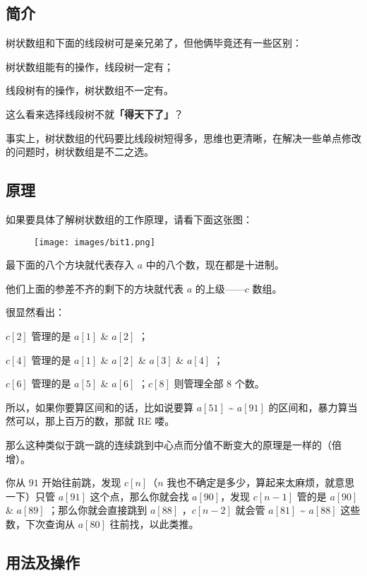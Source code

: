 
\subsection{简介}

\hr

树状数组和下面的线段树可是亲兄弟了，但他俩毕竟还有一些区别：

树状数组能有的操作，线段树一定有；

线段树有的操作，树状数组不一定有。

这么看来选择线段树不就\textbf{「得天下了」}？

事实上，树状数组的代码要比线段树短得多，思维也更清晰，在解决一些单点修改的问题时，树状数组是不二之选。

\hr

\subsection{原理}

如果要具体了解树状数组的工作原理，请看下面这张图：

\begin{figure}[h]
\centering
\texttt{[image: images/bit1.png]} 

\end{figure}

最下面的八个方块就代表存入 $a$ 中的八个数，现在都是十进制。

他们上面的参差不齐的剩下的方块就代表 $a$ 的上级——$c$ 数组。

很显然看出：

$c[2]$ 管理的是 $a[1]$ \& $a[2]$ ；

$c[4]$ 管理的是 $a[1]$ \& $a[2]$ \& $a[3]$ \& $a[4]$ ；

$c[6]$ 管理的是 $a[5]$ \& $a[6]$ ；$c[8]$ 则管理全部 $8$ 个数。

所以，如果你要算区间和的话，比如说要算 $a[51]$ \textasciitilde{} $a[91]$ 的区间和，暴力算当然可以，那上百万的数，那就 RE 喽。

那么这种类似于跳一跳的连续跳到中心点而分值不断变大的原理是一样的（倍增）。

你从 $91$ 开始往前跳，发现 $c[n]$（$n$ 我也不确定是多少，算起来太麻烦，就意思一下）只管 $a[91]$ 这个点，那么你就会找 $a[90]$，发现 $c[n - 1]$ 管的是 $a[90]$ \& $a[89]$ ；那么你就会直接跳到 $a[88]$ ，$c[n - 2]$ 就会管 $a[81]$ \textasciitilde{} $a[88]$ 这些数，下次查询从 $a[80]$ 往前找，以此类推。

\hr

\subsection{用法及操作}

